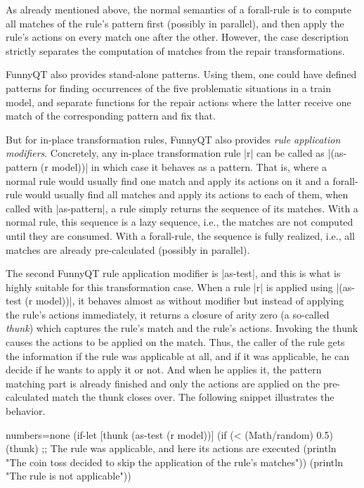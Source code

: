 \documentclass[submission]{eptcs}
\newcommand{\code}{\clojureinline}
\begin{document}
As already mentioned above, the normal semantics of a forall-rule is to compute
all matches of the rule's pattern first (possibly in parallel), and then apply
the rule's actions on every match one after the other.  However, the case
description strictly separates the computation of matches from the repair
transformations.

FunnyQT also provides stand-alone patterns.  Using them, one could have defined
patterns for finding occurrences of the five problematic situations in a train
model, and separate functions for the repair actions where the latter receive
one match of the corresponding pattern and fix that.

But for in-place transformation rules, FunnyQT also provides \emph{rule
  application modifiers}.  Concretely, any in-place transformation rule
\code|r| can be called as \code|(as-pattern (r model))| in which case it
behaves as a pattern.  That is, where a normal rule would usually find one
match and apply its actions on it and a forall-rule would usually find all
matches and apply its actions to each of them, when called with
\code|as-pattern|, a rule simply returns the sequence of its matches.  With a
normal rule, this sequence is a lazy sequence, i.e., the matches are not
computed until they are consumed.  With a forall-rule, the sequence is fully
realized, i.e., all matches are already pre-calculated (possibly in parallel).

The second FunnyQT rule application modifier is \code|as-test|, and this is
what is highly suitable for this transformation case.  When a rule \code|r| is
applied using \code|(as-test (r model))|, it behaves almost as without modifier
but instead of applying the rule's actions immediately, it returns a closure of
arity zero (a so-called \emph{thunk}) which captures the rule's match and the
rule's actions.  Invoking the thunk causes the actions to be applied on the
match.  Thus, the caller of the rule gets the information if the rule was
applicable at all, and if it was applicable, he can decide if he wants to apply
it or not.  And when he applies it, the pattern matching part is already
finished and only the actions are applied on the pre-calculated match the thunk
closes over.  The following snippet illustrates the behavior.

\begin{clojurecode*}{numbers=none}
(if-let [thunk (as-test (r model))]
  (if (< (Math/random) 0.5)
    (thunk) ;; The rule was applicable, and here its actions are executed
    (println "The coin toss decided to skip the application of the rule's matches"))
  (println "The rule is not applicable"))
\end{clojurecode*}
\end{document}
